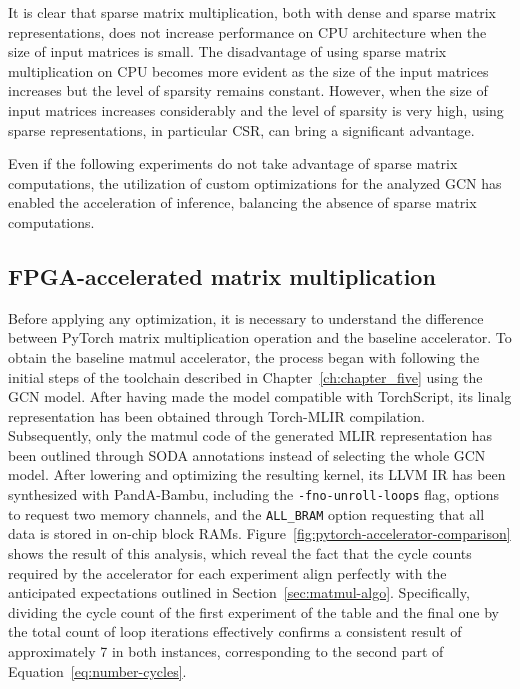 It is clear that sparse matrix multiplication, both with dense and sparse matrix representations, does not increase performance on CPU architecture when the size of input matrices is small.
The disadvantage of using sparse matrix multiplication on CPU becomes more evident as the size of the input matrices increases but the level of sparsity remains constant.
However, when the size of input matrices increases considerably and the level of sparsity is very high, using sparse representations, in particular CSR, can bring a significant advantage.

Even if the following experiments do not take advantage of sparse matrix computations, the utilization of custom optimizations for the analyzed GCN has enabled the acceleration of inference, balancing the absence of sparse matrix computations.

\subsection{FPGA-accelerated matrix multiplication}
\label{subsec:optimization-comparison}%

Before applying any optimization, it is necessary to understand the difference between PyTorch matrix multiplication operation and the baseline accelerator.
To obtain the baseline matmul accelerator, the process began with following the initial steps of the toolchain described in Chapter~\ref{ch:chapter_five} using the GCN model.
After having made the model compatible with TorchScript, its linalg representation has been obtained through Torch-MLIR compilation.
Subsequently, only the matmul code of the generated MLIR representation has been outlined through SODA annotations instead of selecting the whole GCN model.
After lowering and optimizing the resulting kernel, its LLVM IR has been synthesized with PandA-Bambu, including the \lstinline{-fno-unroll-loops} flag, options to request two memory channels, and the \lstinline{ALL_BRAM} option requesting that all data is stored in on-chip block RAMs.
Figure~\ref{fig:pytorch-accelerator-comparison} shows the result of this analysis, which reveal the fact that the cycle counts required by the accelerator for each experiment align perfectly with the anticipated expectations outlined in Section~\ref{sec:matmul-algo}.
Specifically, dividing the cycle count of the first experiment of the table and the final one by the total count of loop iterations effectively confirms a consistent result of approximately 7 in both instances, corresponding to the second part of Equation~\ref{eq:number-cycles}.

